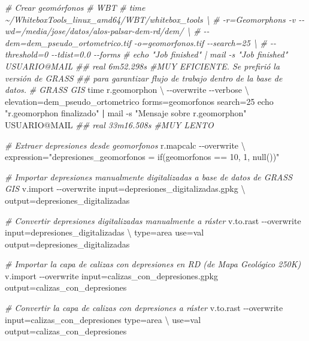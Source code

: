 \documentclass[spanish]{article}
\newenvironment{Shaded}{\begin{snugshade}}{\end{snugshade}}
\newcommand{\AttributeTok}[1]{\textcolor[rgb]{0.77,0.63,0.00}{#1}}
\newcommand{\BuiltInTok}[1]{#1}
\newcommand{\CommentTok}[1]{\textcolor[rgb]{0.56,0.35,0.01}{\textit{#1}}}
\newcommand{\DataTypeTok}[1]{\textcolor[rgb]{0.13,0.29,0.53}{#1}}
\newcommand{\ExtensionTok}[1]{#1}
\newcommand{\KeywordTok}[1]{\textcolor[rgb]{0.13,0.29,0.53}{\textbf{#1}}}
\newcommand{\NormalTok}[1]{#1}
\newcommand{\StringTok}[1]{\textcolor[rgb]{0.31,0.60,0.02}{#1}}
\begin{document}
\begin{Shaded}
\begin{Highlighting}[]
\CommentTok{\# Crear geomórfonos}
\CommentTok{\# WBT}
\CommentTok{\# time \textasciitilde{}/WhiteboxTools\_linux\_amd64/WBT/whitebox\_tools \textbackslash{}}
\CommentTok{\#   {-}r=Geomorphons {-}v {-}{-}wd=\textquotesingle{}/media/jose/datos/alos{-}palsar{-}dem{-}rd/dem/\textquotesingle{} \textbackslash{}}
\CommentTok{\#   {-}{-}dem=dem\_pseudo\_ortometrico.tif {-}o=geomorfonos.tif {-}{-}search=25 \textbackslash{}}
\CommentTok{\#   {-}{-}threshold=0 {-}{-}tdist=0.0 {-}{-}forms}
\CommentTok{\# echo "Job finished" | mail {-}s "Job finished" USUARIO@MAIL}
\CommentTok{\#\# real 6m52.298s \#MUY EFICIENTE. Se prefirió la versión de GRASS }
\CommentTok{\#\# para garantizar flujo de trabajo dentro de la base de datos.}
\CommentTok{\# GRASS GIS}
\BuiltInTok{time}\NormalTok{ r.geomorphon }\DataTypeTok{\textbackslash{}}
  \AttributeTok{{-}{-}overwrite} \AttributeTok{{-}{-}verbose} \DataTypeTok{\textbackslash{}}
\NormalTok{  elevation=dem\_pseudo\_ortometrico forms=geomorfonos search=25}
\BuiltInTok{echo} \StringTok{"r.geomorphon finalizado"} \KeywordTok{|} \ExtensionTok{mail} \AttributeTok{{-}s} \StringTok{"Mensaje sobre r.geomorphon"}\NormalTok{ USUARIO@MAIL}
\CommentTok{\#\# real 33m16.508s \#MUY LENTO}

\CommentTok{\# Extraer depresiones desde geomorfonos}
\ExtensionTok{r.mapcalc} \AttributeTok{{-}{-}overwrite} \DataTypeTok{\textbackslash{}}
\NormalTok{  expression=}\StringTok{"\textquotesingle{}depresiones\_geomorfonos\textquotesingle{} = if(geomorfonos == 10, 1, null())"}

\CommentTok{\# Importar depresiones manualmente digitalizadas a base de datos de GRASS GIS}
\ExtensionTok{v.import} \AttributeTok{{-}{-}overwrite}\NormalTok{ input=depresiones\_digitalizadas.gpkg }\DataTypeTok{\textbackslash{}}
\NormalTok{  output=depresiones\_digitalizadas}

\CommentTok{\# Convertir depresiones digitalizadas manualmente a ráster}
\ExtensionTok{v.to.rast} \AttributeTok{{-}{-}overwrite}\NormalTok{ input=depresiones\_digitalizadas }\DataTypeTok{\textbackslash{}}
\NormalTok{  type=area use=val output=depresiones\_digitalizadas}

\CommentTok{\# Importar la capa de calizas con depresiones en RD (de Mapa Geológico 250K)}
\ExtensionTok{v.import} \AttributeTok{{-}{-}overwrite}\NormalTok{ input=calizas\_con\_depresiones.gpkg output=calizas\_con\_depresiones}

\CommentTok{\# Convertir la capa de calizas con depresiones a ráster}
\ExtensionTok{v.to.rast} \AttributeTok{{-}{-}overwrite}\NormalTok{ input=calizas\_con\_depresiones type=area }\DataTypeTok{\textbackslash{}}
\NormalTok{  use=val output=calizas\_con\_depresiones}


\end{Highlighting}
\end{Shaded}
\end{document}
